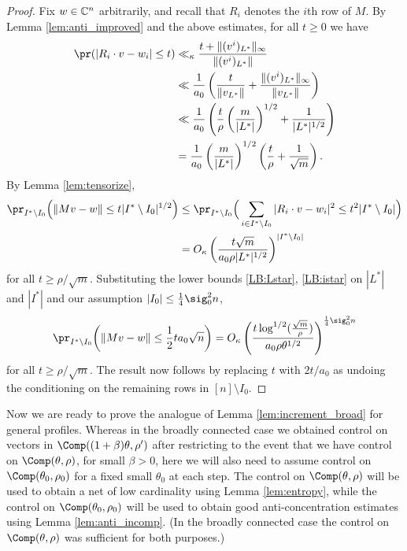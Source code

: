 \documentclass[aop,preprint]{imsart}
\theoremstyle{plain}
\theoremstyle{definition}
\theoremstyle{remark}
\numberwithin{equation}{section}
\numberwithin{theorem}{section}
\begin{document}
\begin{proof}
Fix $w\in {\mathbb C}^n$ arbitrarily, and recall that $R_i$ denotes the $i$th row of $M$.
%
By Lemma \ref{lem:anti_improved} and the above estimates,
for all $t\ge 0$ we have 
\begin{align*}
\pr(|R_i\cdot v-w_i|\le t)
&\ll_\kappa \frac{t+ \|(v^i)_{L^*}\|_\infty }{\|(v^i)_{L^*}\|}\\
&\ll \frac{1}{a_0} \left( \frac{t}{\|v_{L^*}\|} + \frac{\|(v^i)_{L^*}\|_\infty}{\|v_{L^*}\|}\right)\\
&\ll \frac1{a_0} \left( \frac{t}{\rho} \left(\frac{m}{|L^*|}\right)^{1/2} + \frac1{|L^*|^{1/2}}\right)\\
&= \frac1{a_0} \left( \frac{m}{|L^*|}\right)^{1/2} \left( \frac{t}{\rho} + \frac1{\sqrt{m}}\right).
\end{align*}
By Lemma \ref{lem:tensorize}, 
\begin{align*}
\pr_{I^*\setminus I_0} \Big( \|Mv-w\| \le t |I^*\setminus I_0|^{1/2}\Big) 
&\le \pr_{I^*\setminus I_0} \Big( \sum_{i\in I^*\setminus I_0}|R_i\cdot v - w_i|^2  \le t^2 |I^*\setminus I_0|\Big) \\
&= O_\kappa\left(\frac{t\sqrt{m}}{a_0\rho|L^*|^{1/2}}\right)^{|I^*\setminus I_0|}
\end{align*}
for all $t\ge \rho/\sqrt{m}$.
Substituting the lower bounds \eqref{LB:Lstar}, \eqref{LB:istar} on $|L^*|$ and $|I^*|$ and our assumption $|I_0| \le \frac14\sig_0^2n$, 
\[
\pr_{I^*\setminus I_0} \bigg( \|Mv-w\| \le  \frac12ta_0\sqrt{n} \bigg) = O_\kappa\left(\frac{t\log^{1/2}(\frac{\sqrt{m}}{\rho})}{a_0\rho \theta^{1/2}}\right)^{\frac14\sig_0^2n}
\]
for all $t\ge \rho/\sqrt{m}$.
The result now follows by replacing $t$ with $2t/a_0$ as undoing the conditioning on the remaining rows in $[n]\setminus I_0$.
\end{proof}

Now we are ready to prove the analogue of Lemma \ref{lem:increment_broad} for general profiles.
Whereas in the broadly connected case we obtained control on vectors in $\Comp((1+\beta)\theta,\rho')$ after restricting to the event that we have control on $\Comp(\theta,\rho)$, for small $\beta>0$, here we will also need to assume control on $\Comp(\theta_0,\rho_0)$ for a fixed small $\theta_0$ at each step. 
The control on $\Comp(\theta,\rho)$ will be used to obtain a net of low cardinality using Lemma \ref{lem:entropy}, while the control on $\Comp(\theta_0,\rho_0)$ will be used to obtain good anti-concentration estimates using Lemma \ref{lem:anti_incomp}. 
(In the broadly connected case the control on $\Comp(\theta,\rho)$ was sufficient for both purposes.)
\end{document}
